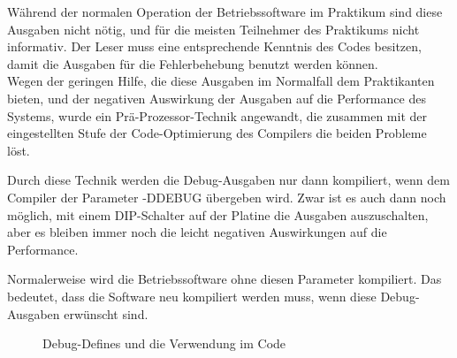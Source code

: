 Während der normalen Operation der Betriebssoftware im Praktikum sind diese Ausgaben
nicht nötig, und für die meisten Teilnehmer des Praktikums nicht informativ.
Der Leser muss eine entsprechende Kenntnis des Codes besitzen, damit die Ausgaben
für die Fehlerbehebung benutzt werden können.\\
Wegen der geringen Hilfe, die diese Ausgaben im Normalfall dem Praktikanten bieten,
und der negativen Auswirkung der Ausgaben auf die Performance des Systems, wurde
ein Prä-Prozessor-Technik angewandt, die zusammen mit der eingestellten Stufe der
Code-Optimierung des Compilers die beiden Probleme löst.

Durch diese Technik werden die Debug-Ausgaben nur dann kompiliert,
wenn dem Compiler der Parameter -DDEBUG übergeben wird. 
Zwar ist es auch dann noch möglich, mit einem DIP-Schalter auf der Platine die Ausgaben
auszuschalten, aber es bleiben immer noch die leicht negativen Auswirkungen auf die Performance.

Normalerweise
wird die Betriebssoftware ohne diesen Parameter kompiliert. Das bedeutet, dass die Software neu kompiliert werden muss, wenn
diese Debug-Ausgaben erwünscht sind.
\begin{figure}[htb]
 \centering
 \caption{\label{debug_trick}Debug-Defines und die Verwendung im Code}
\end{figure}

